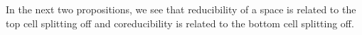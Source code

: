 In the next two propositions, we see that reducibility of a space is related to the top cell splitting off and coreducibility is related to the bottom cell splitting off.

